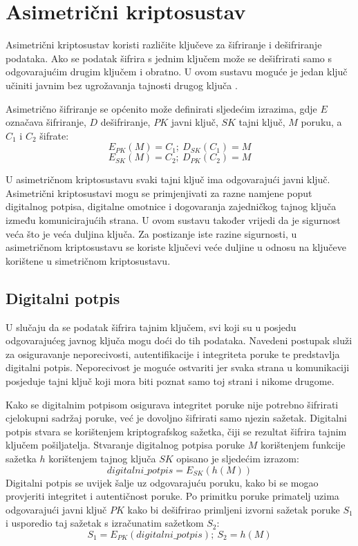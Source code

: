 \section{Asimetrični kriptosustav}
Asimetrični kriptosustav koristi različite ključeve za šifriranje i dešifriranje
podataka. Ako se podatak šifrira s jednim ključem može se dešifrirati samo s
odgovarajućim drugim
ključem i obratno. U ovom sustavu moguće je jedan ključ učiniti javnim bez
ugrožavanja tajnosti drugog ključa \cite[str. 49]{van2011encyclopedia}.

Asimetrično šifriranje se općenito može definirati sljedećim izrazima, gdje $E$
označava šifriranje, $D$ dešifriranje, $PK$ javni ključ, $SK$ tajni ključ, $M$
poruku, a $C_1$ i $C_2$ šifrate:
$$E_{PK}(M)=C_1;\ D_{SK}(C_1)=M$$
$$E_{SK}(M)=C_2;\ D_{PK}(C_2)=M$$

U asimetričnom kriptosustavu svaki tajni ključ ima odgovarajući javni
ključ. Asimetrični kriptosustavi mogu se primjenjivati za razne namjene poput
digitalnog potpisa, digitalne omotnice i dogovaranja zajedničkog tajnog ključa
između komunicirajućih strana. U ovom sustavu također vrijedi da je sigurnost
veća što je veća duljina ključa.
Za postizanje iste razine sigurnosti, u asimetričnom kriptosustavu se
koriste ključevi veće duljine u odnosu na ključeve korištene u simetričnom
kriptosustavu.

\subsection{Digitalni potpis}
U slučaju da se podatak šifrira tajnim ključem, svi koji su u posjedu
odgovarajućeg javnog ključa mogu doći do tih podataka. Navedeni postupak služi
za osiguravanje neporecivosti, autentifikacije i integriteta poruke te
predstavlja digitalni potpis. Neporecivost je moguće ostvariti jer svaka strana
u komunikaciji posjeduje tajni ključ koji mora biti poznat samo toj strani i
nikome drugome.

Kako se digitalnim potpisom osigurava integritet poruke nije potrebno šifrirati
cjelokupni sadržaj poruke, već je dovoljno šifrirati samo njezin sažetak.
Digitalni potpis stvara se korištenjem kriptografskog sažetka, čiji se
rezultat šifrira tajnim ključem pošiljatelja. Stvaranje digitalnog potpisa
poruke $M$
korištenjem funkcije sažetka $h$ korištenjem tajnog ključa $SK$ opisano je
sljedećim izrazom:
$$\mathit{digitalni\_potpis} = E_{SK}(h(M))$$
Digitalni potpis se uvijek šalje uz odgovarajuću poruku, kako bi se mogao
provjeriti integritet i autentičnost poruke. Po primitku poruke primatelj uzima
odgovarajući javni ključ $PK$ kako bi dešifrirao primljeni izvorni sažetak
poruke $S_1$ i
usporedio taj sažetak s izračunatim sažetkom $S_2$:
$$S_1 = E_{PK}(\mathit{digitalni\_potpis});\ S_2=h(M)$$

